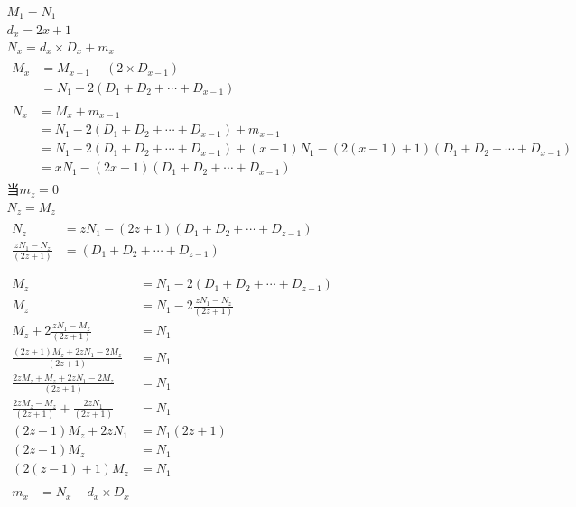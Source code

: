 \documentclass{article}
\begin{document}
\begin{gather*}
  M_1 = N_1 \\
  d_x = 2x + 1 \\
  N_x = d_{x} \times D_{x} + m_{x} \\
  \begin{aligned}
    M_{x} &= M_{x-1} - (2 \times D_{x-1}) \\
          &= N_1 - 2 (D_1 + D_2 + \cdots + D_{x-1})
  \end{aligned} \\
  \begin{aligned}
    N_{x} &= M_{x} + m_{x-1} \\
          &= N_1 - 2 (D_1 + D_2 + \cdots + D_{x-1}) + m_{x-1} \\
          &= N_1 - 2 (D_1 + D_2 + \cdots + D_{x-1}) + (x-1)N_1 - (2(x-1) + 1)(D_1 + D_2 + \cdots + D_{x - 1}) \\
          &= xN_1 - (2x + 1)(D_1 + D_2 + \cdots + D_{x-1})
  \end{aligned} \\
  \text{当}m_z = 0 \\
  N_z = M_z \\
  \begin{aligned}
    N_z &= zN_1 - (2z + 1)(D_1 + D_2 + \cdots + D_{z - 1}) \\
    \frac{zN_1 - N_z}{(2z + 1)} &= (D_1 + D_2 + \cdots + D_{z - 1}) \\
  \end{aligned} \\
  \begin{aligned}
    M_z &= N_1 - 2(D_1 + D_2 + \cdots + D_{z - 1}) \\
    M_z &= N_1 - 2\frac{zN_1 - N_z}{(2z + 1)} \\
    M_z + 2\frac{zN_1 - M_z}{(2z + 1)} &= N_1 \\
    \frac{(2z + 1)M_z + 2zN_1 - 2M_z}{(2z + 1)} &= N_1 \\
    \frac{2zM_z + M_z + 2zN_1 - 2M_z}{(2z + 1)} &= N_1 \\
    \frac{2zM_z - M_z}{(2z + 1)} + \frac{2zN_1}{(2z + 1)} &= N_1 \\
    (2z - 1)M_z + 2zN_1 &= N_1(2z + 1) \\
    (2z-1)M_z &= N_1 \\
    (2(z - 1) + 1)M_z &= N_1
  \end{aligned} \\
  \begin{aligned}
    m_{x} &= N_x - d_x \times D_x \\

\end{aligned}
\end{gather*}
\end{document}
